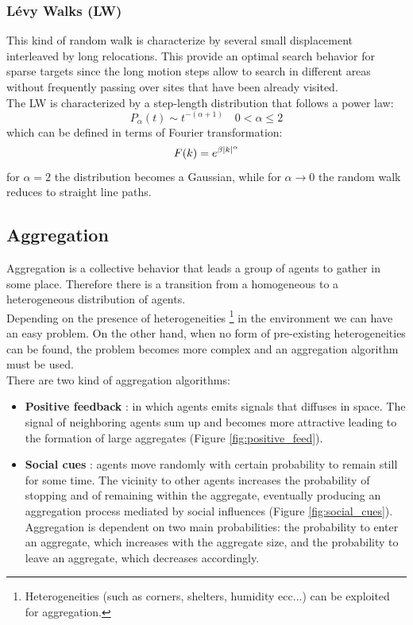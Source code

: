 \documentclass[10pt,a4paper]{article}
\begin{document}
\subsubsection{Lévy Walks (LW)}
This kind of random walk is characterize by several small displacement interleaved by long relocations. This provide an optimal search behavior for sparse targets since the long motion steps allow to search in different areas without frequently passing over sites that have been already visited.\\
The LW is characterized by a step-length distribution that follows a power law:
\[P_{\alpha}(t)\sim t^{-(\alpha+1)}\quad 0<\alpha \le 2\]
which can be defined in terms of Fourier transformation:
\[F(k)=e^{\-\beta|k|^{\alpha}}\]
for $\alpha=2$ the distribution becomes a Gaussian, while for $\alpha \rightarrow 0$ the random walk reduces to straight line paths.



\subsection{Aggregation}


Aggregation is a collective behavior that leads a group of agents to gather in some place. Therefore there is a transition from a homogeneous to a heterogeneous distribution of agents.\\
Depending on the presence of heterogeneities  \footnote{Heterogeneities (such as corners, shelters, humidity ecc...) can be exploited for aggregation.} in the environment we can have an easy problem. On the other hand, when no form of pre-existing heterogeneities can be found, the problem becomes more complex and an aggregation algorithm must be used.\\

There are two kind of aggregation algorithms:
\begin{itemize}
\item \textbf{Positive feedback} : in which agents emits signals that diffuses in space. The signal of neighboring agents sum up and becomes more attractive leading to the formation of large aggregates (Figure \ref{fig:positive_feed}).
\item \textbf{Social cues} : agents move randomly with certain probability to remain still for some time. The vicinity to other agents increases the probability of stopping and of remaining within the aggregate, eventually producing an aggregation process mediated by social influences (Figure \ref{fig:social_cues}). Aggregation is dependent on two main probabilities: the probability to enter an aggregate, which increases with the aggregate size, and the probability to leave an aggregate, which decreases accordingly.
\end{itemize}
\end{document}
